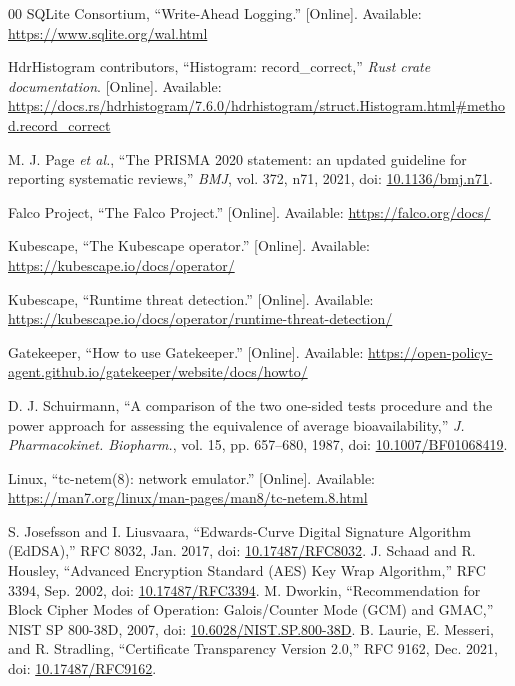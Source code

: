 \documentclass{ieeeaccess}
\begin{document}
\begin{thebibliography}{00}
 SQLite Consortium, ``Write-Ahead Logging.'' [Online]. Available: \url{https://www.sqlite.org/wal.html}

 HdrHistogram contributors, ``Histogram: record\_correct,'' \emph{Rust crate documentation}. [Online]. Available: \url{https://docs.rs/hdrhistogram/7.6.0/hdrhistogram/struct.Histogram.html#method.record_correct}

 M. J. Page \textit{et al.}, ``The PRISMA 2020 statement: an updated guideline for reporting systematic reviews,'' \emph{BMJ}, vol. 372, n71, 2021, doi: \href{https://doi.org/10.1136/bmj.n71}{10.1136/bmj.n71}.

 Falco Project, ``The Falco Project.'' [Online]. Available: \url{https://falco.org/docs/}

 Kubescape, ``The Kubescape operator.'' [Online]. Available: \url{https://kubescape.io/docs/operator/}

 Kubescape, ``Runtime threat detection.'' [Online]. Available: \url{https://kubescape.io/docs/operator/runtime-threat-detection/}

 Gatekeeper, ``How to use Gatekeeper.'' [Online]. Available: \url{https://open-policy-agent.github.io/gatekeeper/website/docs/howto/}

 D. J. Schuirmann, ``A comparison of the two one-sided tests procedure and the power approach for assessing the equivalence of average bioavailability,'' \emph{J. Pharmacokinet. Biopharm.}, vol. 15, pp. 657--680, 1987, doi: \href{https://doi.org/10.1007/BF01068419}{10.1007/BF01068419}.

 Linux, ``tc-netem(8): network emulator.'' [Online]. Available: \url{https://man7.org/linux/man-pages/man8/tc-netem.8.html}

 S. Josefsson and I. Liusvaara, ``Edwards-Curve Digital Signature Algorithm (EdDSA),'' RFC 8032, Jan. 2017, doi: \href{https://doi.org/10.17487/RFC8032}{10.17487/RFC8032}.
 J. Schaad and R. Housley, ``Advanced Encryption Standard (AES) Key Wrap Algorithm,'' RFC 3394, Sep. 2002, doi: \href{https://doi.org/10.17487/RFC3394}{10.17487/RFC3394}.
 M. Dworkin, ``Recommendation for Block Cipher Modes of Operation: Galois/Counter Mode (GCM) and GMAC,'' NIST SP 800-38D, 2007, doi: \href{https://doi.org/10.6028/NIST.SP.800-38D}{10.6028/NIST.SP.800-38D}.
 B. Laurie, E. Messeri, and R. Stradling, ``Certificate Transparency Version 2.0,'' RFC 9162, Dec. 2021, doi: \href{https://doi.org/10.17487/RFC9162}{10.17487/RFC9162}.

\end{thebibliography}
\end{document}
